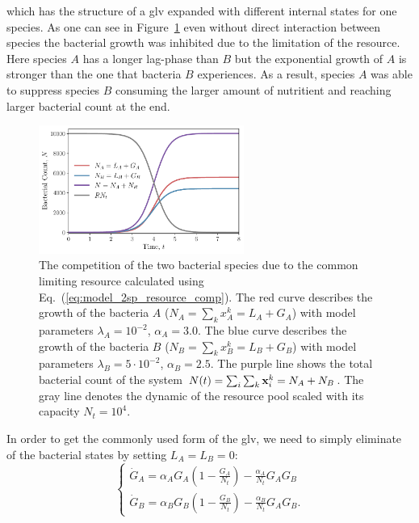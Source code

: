\documentclass[10pt,A4paper]{article}
\begin{document}
which has the structure of a \ac{glv} expanded with different internal states for one species.
As one can see in Figure~\ref{fig:2pool_resource_2sp} even without direct interaction between species the bacterial growth was inhibited due to the limitation of the resource.
Here species $A$ has a longer lag-phase than $B$ but the exponential growth of $A$ is stronger than the one that bacteria $B$ experiences.
As a result, species $A$ was able to suppress species $B$ consuming the larger amount of nutritient and reaching larger bacterial count at the end.
\begin{figure}[H]
    \begin{center}
    \includegraphics[width=0.6\textwidth]{Figures/pool_model_2pools_resource_competition.pdf}
    \caption{
        The competition of the two bacterial species due to the common limiting resource calculated using Eq.~(\ref{eq:model_2sp_resource_comp}).
        The red curve describes the growth of the bacteria $A$ ($N_A = \sum_{k} x_A^k = L_A+G_A$) with model parameters $\lambda_A=10^{-2}$, $\alpha_A=3.0$.
        The blue curve describes the growth of the bacteria $B$ ($N_B = \sum_{k} x_B^k = L_B+G_B$) with model parameters $\lambda_B=5\cdot 10^{-2}$, $\alpha_B=2.5$.
        The purple line shows the total bacterial count of the system  $N(t)=\sum_i\sum_k\mathbf{x}_i^k=N_A+N_B$.
        The gray line denotes the dynamic of the resource pool scaled with its capacity $N_t=10^4$.
    }
    \label{fig:2pool_resource_2sp}
    \end{center}
\end{figure}
%
In order to get the commonly used form of the \ac{glv}, we need to simply eliminate of the bacterial states by setting $L_A=L_B=0$:
\begin{equation}
    \begin{cases}
    \dot{G}_A = \alpha_A G_A\left(1 - \frac{G_A}{N_t}\right) - \frac{\alpha_A}{N_t}G_AG_B\\
    \dot{G}_B = \alpha_B G_B\left(1-\frac{G_B}{N_t}\right) -\frac{\alpha_B}{N_t}G_AG_B. 
    \label{eq:LV_simple}
    \end{cases}
\end{equation}
\end{document}
